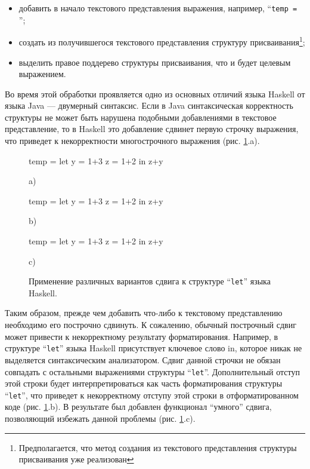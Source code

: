 \documentclass{matmex-diploma}
\begin{document}
\begin{itemize}
\item добавить в начало текстового представления выражения, например, “\lstinline{temp = }”;
\item создать из получившегося текстового представления структуру присваивания\footnote{Предполагается, что метод создания из текстового представления структуры присваивания уже реализован};
\item выделить правое поддерево структуры присваивания, что и будет целевым выражением.
\end{itemize}

Во время этой обработки проявляется одно из основных отличий языка Haskell от языка Java --- двумерный синтаксис. Если в Java синтаксическая корректность структуры не может быть нарушена подобными добавлениями в текстовое представление, то в Haskell это добавление сдвинет первую строчку выражения, что приведет к некорректности многострочного выражения (рис. \ref{haskellFormatSamples}.a).

\begin{figure}[ht]
\noindent\begin{minipage}{.25\textwidth}
    \begin{pyglist}[language=haskell,numbersep=5pt]
temp = let y = 1+3
       z = 1+2
       in  z+y
    \end{pyglist}
\caption*{a)}    
\end{minipage}\hfill
\begin{minipage}{.40\textwidth}
    \begin{pyglist}[language=haskell,numbersep=5pt]
temp = let y = 1+3
           z = 1+2
                  in  z+y 
    \end{pyglist}
\caption*{b)}    
\end{minipage}\hfill
\begin{minipage}{.25\textwidth}
    \begin{pyglist}[language=haskell,numbersep=5pt]
temp = let y = 1+3
           z = 1+2
           in  z+y
    \end{pyglist}
\caption*{c)}    
\end{minipage}
\caption{Применение различных вариантов сдвига к структуре “\lstinline{let}” языка Haskell.}    
\label{haskellFormatSamples}
\end{figure}

Таким образом, прежде чем добавить что-либо к текстовому представлению необходимо его построчно сдвинуть. К сожалению, обычный построчный сдвиг может привести к некорректному результату форматирования. Например, в структуре “\lstinline{let}” языка Haskell присутствует ключевое слово in, которое никак не выделяется синтаксическим анализатором. Сдвиг данной строчки не обязан совпадать с остальными выражениями структуры “\lstinline{let}”. Дополнительный отступ этой строки будет интерпретироваться как часть форматирования структуры “\lstinline{let}”, что приведет к некорректному отступу этой строки в отформатированном коде (рис. \ref{haskellFormatSamples}.b). В результате был добавлен функционал “умного” сдвига, позволяющий избежать данной проблемы (рис. \ref{haskellFormatSamples}.c). 
\end{document}
